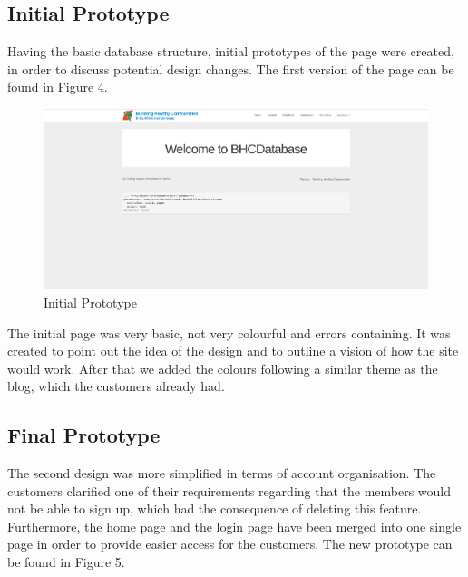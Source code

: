 \documentclass{l3proj}
\begin{document}
\subsection{Initial Prototype}
\label{sec:prototype1}

Having the basic database structure, initial prototypes of the page were created, in order to discuss potential design changes. The first version of the page can be found in Figure 4.

\begin{figure}
 \centerline{\includegraphics[width=\textwidth, height=\textheight, keepaspectratio]{oldhome.png}}
 \caption{Initial Prototype}
\end{figure}

The initial page was very basic, not very colourful and errors containing. It was created to point out the idea of the design and to outline a vision of how the site would work. After that we added the colours following a similar theme as the blog, which the customers already had.

\subsection{Final Prototype}
\label{sec:prototype2}

The second design was more simplified in terms of account organisation. The customers clarified one of their requirements regarding that the members would not be able to sign up, which had the consequence of deleting this feature. Furthermore, the home page and the login page have been merged into one single page in order to provide easier access for the customers. The new prototype can be found in Figure 5.
\end{document}

